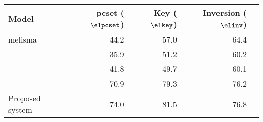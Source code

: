 \begin{tabular}{l|rrrr}
Model                        & \gls{pcset} ($\elpcset$) & Key ($\elkey$) & Inversion ($\elinv$) \\
\hline                       
\gls{melisma}                & 44.2                     & 57.0           & 64.4                 \\
\textcite{mcleod2021modular} & 35.9                     & 51.2           & 60.2                 \\
\textcite{chen2021attend}    & 41.8                     & 49.7           & 60.1                 \\
\textcite{micchi2021deep}    & 70.9                     & 79.3           & 76.2                 \\
Proposed system              & 74.0                     & 81.5           & 76.8    
\end{tabular}

               
